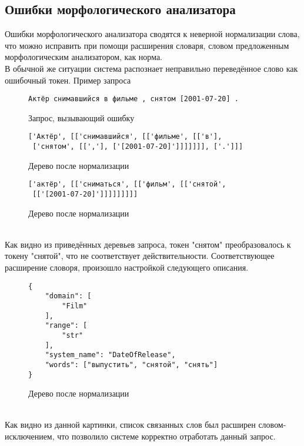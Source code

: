 \subsection{Ошибки морфологического анализатора}
Ошибки морфологического анализатора сводятся к неверной нормализации слова, что можно исправить при помощи расширения словаря, словом предложенным морфологическим анализатором, как норма.\\
В обычной же ситуации система распознает неправильно переведённое слово как ошибочный токен.
Пример запроса
\begin{figure}[!h]
\begin{tcolorbox}[colback=white, sharpish corners]
\begin{verbatim}
Актёр снимавшийся в фильме , снятом [2001-07-20] .
\end{verbatim}
\end{tcolorbox}
\caption{Запрос, вызывающий ошибку}
\end{figure}
\begin{figure}[!h]
\begin{tcolorbox}[colback=white, sharpish corners]
\begin{verbatim}
['Актёр', [['снимавшийся', [['фильме', [['в'],
 ['снятом', [[','], ['[2001-07-20]']]]]]]], ['.']]]
\end{verbatim}
\end{tcolorbox}
\caption{Дерево после нормализации}
\end{figure}
\begin{figure}[!h]
\begin{tcolorbox}[colback=white, sharpish corners]
\begin{verbatim}
['актёр', [['сниматься', [['фильм', [['снятой',
 [['[2001-07-20]']]]]]]]]]
\end{verbatim}
\end{tcolorbox}
\caption{Дерево после нормализации}
\end{figure}
\\Как видно из приведённых деревьев запроса, токен "снятом" преобразовалось к токену "снятой", что не соответствует действительности. Соответствующее расширение словоря, произошло настройкой следующего описания. 
\begin{figure}[!h]
\begin{tcolorbox}[colback=white, sharpish corners]
\begin{verbatim}
{
    "domain": [
        "Film"
    ],
    "range": [
        "str"
    ],
    "system_name": "DateOfRelease",
    "words": ["выпустить", "снятой", "снять"]
}
\end{verbatim}
\end{tcolorbox}
\caption{Дерево после нормализации}
\end{figure}
\\Как видно из данной картинки, список связанных слов был расширен словом-исключением, что позволило системе корректно отработать данный запрос.
